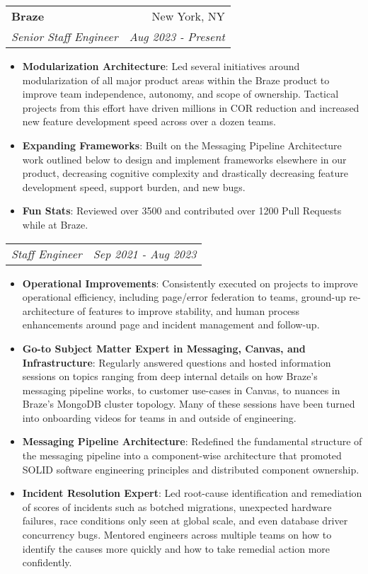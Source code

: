 \documentclass[letterpaper,10pt]{article}
\makeatletter
\newcommand{\resumeItem}[2]{
  \item\small{
    \textbf{#1}{: #2 \vspace{-2pt}}
  }
}
\newcommand{\resumeSubheading}[4]{
  \vspace{-1pt}\item
    \begin{tabular*}{0.97\textwidth}[t]{l@{\extracolsep{\fill}}r}
      \textbf{#1} & #2 \\
      \textit{\small#3} & \textit{\small #4} \\
    \end{tabular*}\vspace{-5pt}
}
\newcommand{\resumeSubSubheading}[2]{
    \begin{tabular*}{0.97\textwidth}{l@{\extracolsep{\fill}}r}
      \textit{\small#1} & \textit{\small #2} \\
    \end{tabular*}\vspace{-5pt}
}
\newcommand{\resumeItemListStart}{\begin{itemize}}
\newcommand{\resumeItemListEnd}{\end{itemize}\vspace{-5pt}}
\makeatother
\begin{document}
    \resumeSubheading
      {Braze}{New York, NY}
      {Senior Staff Engineer}{Aug 2023 - Present}
       \resumeItemListStart
        \resumeItem{Modularization Architecture}
          {Led several initiatives around modularization of all major product areas within the Braze product to improve team independence, autonomy, and scope of ownership. Tactical projects from this effort have driven millions in COR reduction and increased new feature development speed across over a dozen teams.}
        \resumeItem{Expanding Frameworks}
          {Built on the Messaging Pipeline Architecture work outlined below to design and implement frameworks elsewhere in our product, decreasing cognitive complexity and drastically decreasing feature development speed, support burden, and new bugs.}
        \resumeItem{Fun Stats}
          {Reviewed over 3500 and contributed over 1200 Pull Requests while at Braze.}
       \resumeItemListEnd
    \resumeSubSubheading
      {Staff Engineer}{Sep 2021 - Aug 2023}
       \resumeItemListStart
        \resumeItem{Operational Improvements}
          {Consistently executed on projects to improve operational efficiency, including page/error federation to teams, ground-up re-architecture of features to improve stability, and human process enhancements around page and incident management and follow-up.}
        \resumeItem{Go-to Subject Matter Expert in Messaging, Canvas, and Infrastructure}
          {Regularly answered questions and hosted information sessions on topics ranging from deep internal details on how Braze's messaging pipeline works, to customer use-cases in Canvas, to nuances in Braze's MongoDB cluster topology. Many of these sessions have been turned into onboarding videos for teams in and outside of engineering.}
        \resumeItem{Messaging Pipeline Architecture}
          {Redefined the fundamental structure of the messaging pipeline into a component-wise architecture that promoted SOLID software engineering principles and distributed component ownership.}
        \resumeItem{Incident Resolution Expert}
          {Led root-cause identification and remediation of scores of incidents such as botched migrations, unexpected hardware failures, race conditions only seen at global scale, and even database driver concurrency bugs. Mentored engineers across multiple teams on how to identify the causes more quickly and how to take remedial action more confidently.}
      \resumeItemListEnd
\end{document}

